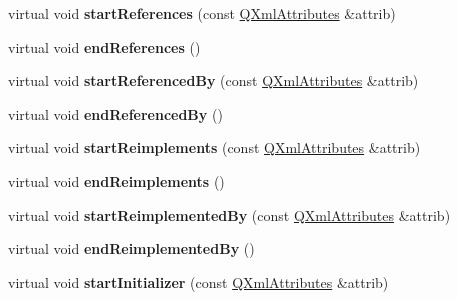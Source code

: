 \begin{DoxyCompactItemize}
\item 
\mbox{\label{class_member_handler_aeccae0921031f5ec6c17dc5f33c0bb52}} 
virtual void {\bfseries start\+References} (const \mbox{\hyperlink{class_q_xml_attributes}{Q\+Xml\+Attributes}} \&attrib)
\item 
\mbox{\label{class_member_handler_aed73fc9ee9b52644d194481529401020}} 
virtual void {\bfseries end\+References} ()
\item 
\mbox{\label{class_member_handler_a49b02da000b253dcc64b785dbdc800de}} 
virtual void {\bfseries start\+Referenced\+By} (const \mbox{\hyperlink{class_q_xml_attributes}{Q\+Xml\+Attributes}} \&attrib)
\item 
\mbox{\label{class_member_handler_ae5d1c054c01f753e64ecd7f4c933d565}} 
virtual void {\bfseries end\+Referenced\+By} ()
\item 
\mbox{\label{class_member_handler_a41e9ad55b9eef3b7ce631b639538e2b8}} 
virtual void {\bfseries start\+Reimplements} (const \mbox{\hyperlink{class_q_xml_attributes}{Q\+Xml\+Attributes}} \&attrib)
\item 
\mbox{\label{class_member_handler_a0c6b38a50a32be808b8b8d17ebbee0f4}} 
virtual void {\bfseries end\+Reimplements} ()
\item 
\mbox{\label{class_member_handler_a2c069ebfd4d78463b4a6158ec36b605e}} 
virtual void {\bfseries start\+Reimplemented\+By} (const \mbox{\hyperlink{class_q_xml_attributes}{Q\+Xml\+Attributes}} \&attrib)
\item 
\mbox{\label{class_member_handler_adee54201328cb06c72c1d613ecf3daab}} 
virtual void {\bfseries end\+Reimplemented\+By} ()
\item 
\mbox{\label{class_member_handler_a4bc1ca8945014fb5ff5b2199717c234e}} 
virtual void {\bfseries start\+Initializer} (const \mbox{\hyperlink{class_q_xml_attributes}{Q\+Xml\+Attributes}} \&attrib)
\item 
\mbox{\label{class_member_handler_af8158fab4f0b713c91d115a40d20554b}} 

\end{DoxyCompactItemize}

